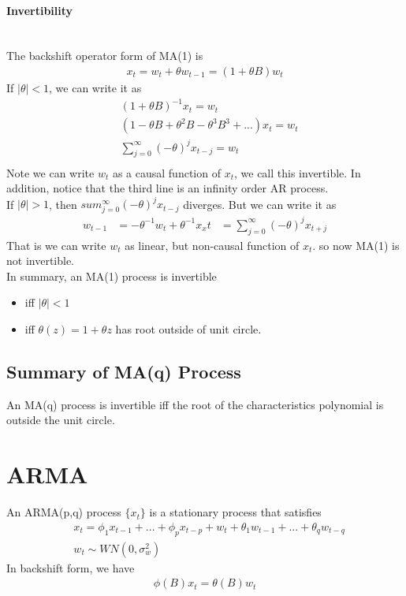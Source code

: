 \paragraph{Invertibility} \mbox{}\\
The backshift operator form of MA(1) is 
    \begin{align*}
        x_t = w_t + \theta w_{t-1} = (1 + \theta B) w_t 
    \end{align*}
If $|\theta| < 1$, we can write it as 
    \begin{align*}
        & (1 + \theta B)^{-1} x_t = w_t \\
        & (1 - \theta B + \theta^2 B - \theta^3  B^3 + ... ) x_t = w_t  \tag{geometric series} \\
        & \sum_{j=0}^\infty (-\theta)^j x_{t-j} = w_t \\
    \end{align*}
Note we can write $w_t$ as a causal function of $x_t$, we call this invertible. In addition, notice that the third line is an infinity order AR process. \\
If $|\theta| > 1$, then $sum_{j=0}^\infty (-\theta)^j x_{t-j}$ diverges. But we can write it as 
    \begin{align*}
        w_{t-1} 
        & = -\theta^{-1} w_t + \theta^{-1} x_xt 
        & = \sum_{j=0}^\infty (-\theta)^j x_{t+j}
    \end{align*}
That is we can write $w_t$ as linear, but non-causal function of $x_t$. so now MA(1) is not invertible. \\
In summary, an MA(1) process is invertible 
    \begin{itemize}
        \item iff $|\theta| < 1$
        \item iff $\theta(z) = 1 + \theta z$ has root outside of unit circle. 
    \end{itemize}
    
\subsection{Summary of MA(q) Process}     
An MA(q) process is invertible iff the root of the characteristics polynomial is outside the unit circle. 
    
    
  

\section{ARMA} 
An ARMA(p,q) process $\{ x_t \}$ is a stationary process that satisfies 
    \begin{align*}
        & x_t = \phi_1 x_{t-1} + ... + \phi_p x_{t-p} + w_t + \theta_1 w_{t-1} + ... + \theta_q w_{t-q}\\
        & w_t \sim WN(0, \sigma^2_w)
    \end{align*}
In backshift form, we have 
    \begin{align*}
        \phi(B)x_t = \theta(B)w_t
    \end{align*}



